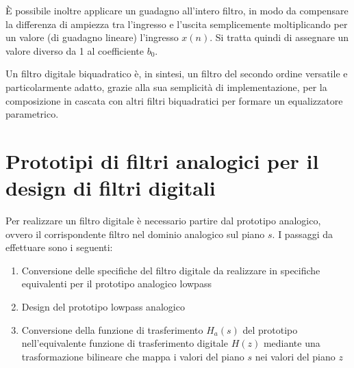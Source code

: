 \documentclass[12pt]{report}
\begin{document}
È possibile inoltre applicare un guadagno all'intero filtro, in modo da compensare la differenza di ampiezza tra l'ingresso e l'uscita semplicemente moltiplicando per un valore (di guadagno lineare) l'ingresso \(x(n)\). Si tratta quindi di assegnare un valore diverso da 1 al coefficiente \(b_0\).

Un filtro digitale biquadratico è, in sintesi, un filtro del secondo ordine versatile e particolarmente adatto, grazie alla sua semplicità di implementazione, per la composizione in cascata con altri filtri biquadratici per formare un equalizzatore parametrico.

\section{Prototipi di filtri analogici per il design di filtri digitali}
Per realizzare un filtro digitale è necessario partire dal prototipo analogico, ovvero il corrispondente filtro nel dominio analogico sul piano \(s\). I passaggi da effettuare sono i seguenti:
\begin{enumerate}
    \item Conversione delle specifiche del filtro digitale da realizzare in specifiche equivalenti per il prototipo analogico lowpass
    \item Design del prototipo lowpass analogico
    \item Conversione della funzione di trasferimento \(H_a(s)\) del prototipo nell'equivalente funzione di trasferimento digitale \(H(z)\) mediante una trasformazione bilineare che mappa i valori del piano \(s\) nei valori del piano \(z\)
\end{enumerate}


%
%
 

%
%

\printbibliography

\closingpage
\end{document}

